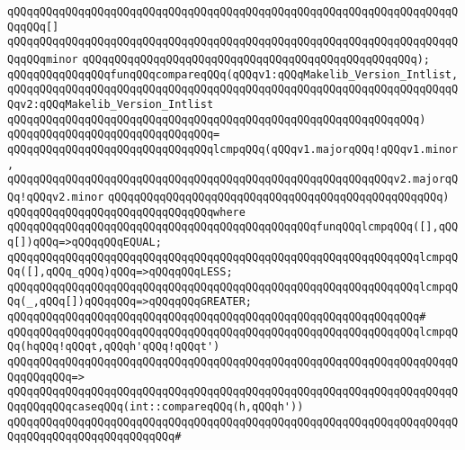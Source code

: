 \verb|qQQqqQQqqQQqqQQqqQQqqQQqqQQqqQQqqQQqqQQqqQQqqQQqqQQqqQQqqQQqqQQqqQQqqQQqqQQq[]|\newline
\verb|qQQqqQQqqQQqqQQqqQQqqQQqqQQqqQQqqQQqqQQqqQQqqQQqqQQqqQQqqQQqqQQqqQQqqQQqqQQqminor|\newline
\verb|qQQqqQQqqQQqqQQqqQQqqQQqqQQqqQQqqQQqqQQqqQQqqQQqqQQq);|\newline
\newline
\verb|qQQqqQQqqQQqqQQqfunqQQqcompareqQQq(qQQqv1:qQQqMakelib_Version_Intlist,|\newline
\verb|qQQqqQQqqQQqqQQqqQQqqQQqqQQqqQQqqQQqqQQqqQQqqQQqqQQqqQQqqQQqqQQqqQQqqQQqv2:qQQqMakelib_Version_Intlist|\newline
\verb|qQQqqQQqqQQqqQQqqQQqqQQqqQQqqQQqqQQqqQQqqQQqqQQqqQQqqQQqqQQqqQQq)|\newline
\verb|qQQqqQQqqQQqqQQqqQQqqQQqqQQqqQQq=|\newline
\verb|qQQqqQQqqQQqqQQqqQQqqQQqqQQqqQQqlcmpqQQq(qQQqv1.majorqQQq!qQQqv1.minor,|\newline
\verb|qQQqqQQqqQQqqQQqqQQqqQQqqQQqqQQqqQQqqQQqqQQqqQQqqQQqqQQqqQQqv2.majorqQQq!qQQqv2.minor|\newline
\verb|qQQqqQQqqQQqqQQqqQQqqQQqqQQqqQQqqQQqqQQqqQQqqQQqqQQq)|\newline
\verb|qQQqqQQqqQQqqQQqqQQqqQQqqQQqqQQqwhere|\newline
\verb|qQQqqQQqqQQqqQQqqQQqqQQqqQQqqQQqqQQqqQQqqQQqqQQqfunqQQqlcmpqQQq([],qQQq[])qQQq=>qQQqqQQqEQUAL;|\newline
\verb|qQQqqQQqqQQqqQQqqQQqqQQqqQQqqQQqqQQqqQQqqQQqqQQqqQQqqQQqqQQqqQQqlcmpqQQq([],qQQq_qQQq)qQQq=>qQQqqQQqLESS;|\newline
\verb|qQQqqQQqqQQqqQQqqQQqqQQqqQQqqQQqqQQqqQQqqQQqqQQqqQQqqQQqqQQqqQQqlcmpqQQq(_,qQQq[])qQQqqQQq=>qQQqqQQqGREATER;|\newline
\verb|qQQqqQQqqQQqqQQqqQQqqQQqqQQqqQQqqQQqqQQqqQQqqQQqqQQqqQQqqQQqqQQq#|\newline
\verb|qQQqqQQqqQQqqQQqqQQqqQQqqQQqqQQqqQQqqQQqqQQqqQQqqQQqqQQqqQQqqQQqlcmpqQQq(hqQQq!qQQqt,qQQqh'qQQq!qQQqt')|\newline
\verb|qQQqqQQqqQQqqQQqqQQqqQQqqQQqqQQqqQQqqQQqqQQqqQQqqQQqqQQqqQQqqQQqqQQqqQQqqQQqqQQq=>|\newline
\verb|qQQqqQQqqQQqqQQqqQQqqQQqqQQqqQQqqQQqqQQqqQQqqQQqqQQqqQQqqQQqqQQqqQQqqQQqqQQqqQQqcaseqQQq(int::compareqQQq(h,qQQqh'))|\newline
\verb|qQQqqQQqqQQqqQQqqQQqqQQqqQQqqQQqqQQqqQQqqQQqqQQqqQQqqQQqqQQqqQQqqQQqqQQqqQQqqQQqqQQqqQQqqQQqqQQq#|\newline
